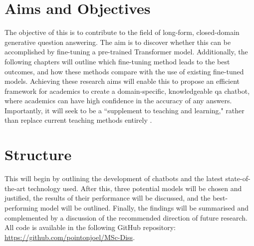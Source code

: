 \section{Aims and Objectives} %
\label{sec:intro_aims_and_objectives}

The objective of this \papertype is to contribute to the field of long-form, closed-domain generative question answering. The aim is to discover whether this can be accomplished by fine-tuning a pre-trained Transformer model. Additionally, the following chapters will outline which fine-tuning method leads to the best outcomes, and how these methods compare with the use of existing fine-tuned models. Achieving these research aims will enable this \papertype to propose an efficient framework for academics to create a domain-specific, knowledgeable \acrshort{qa} chatbot, where academics can have high confidence in the accuracy of any answers. Importantly, it will seek to be a ``supplement to teaching and learning," rather than replace current teaching methods entirely \citep{Nee2023ExploringTT}. 





\section{Structure}
\label{sec:intro_paper_structure}

This \papertype will begin by outlining the development of chatbots and the latest state-of-the-art technology used. After this, three potential models will be chosen and justified, the results of their performance will be discussed, and the best-performing model will be outlined. Finally, the findings will be summarised and complemented by a discussion of the recommended direction of future research. All code is available in the following GitHub repository: \url{https://github.com/pointonjoel/MSc-Diss}. %

